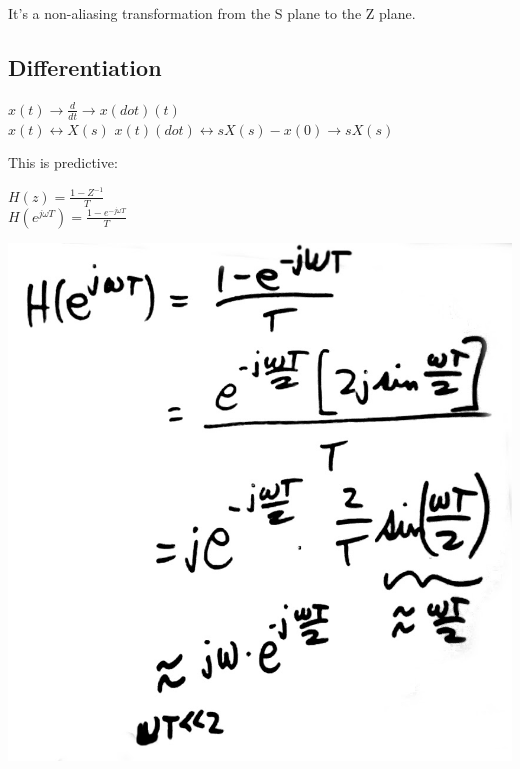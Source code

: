 It's a non-aliasing transformation from the S plane to the Z plane. 


\subsection*{Differentiation}

$x(t) \rightarrow \frac{d}{dt} \rightarrow x(dot)(t) $ \\

$x(t) \leftrightarrow X(s)$
$x(t)(dot) \leftrightarrow sX(s) - x(0) \rightarrow sX(s) $


This is predictive:


$H(z) = \frac{1 - Z^{-1}}{T}$ \\
$H(e^{j \omega T}) = \frac{1 - e^{-j \omega T}}{T}$


\includegraphics[scale=0.25]{photos/jan17/9d}

